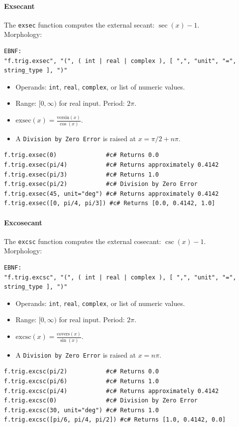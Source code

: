 \paragraph{Exsecant}
The \texttt{exsec} function computes the external secant: $\sec(x) - 1$.\\
Morphology:
\begin{verbatim}
EBNF:
"f.trig.exsec", "(", ( int | real | complex ), [ ",", "unit", "=", string_type ], ")"
\end{verbatim}
\begin{itemize}
\item Operands: \texttt{int}, \texttt{real}, \texttt{complex}, or list of numeric values.
\item Range: $[0, \infty)$ for real input. Period: $2\pi$.
\item $\text{exsec}(x) = \frac{\text{versin}(x)}{\cos(x)}$.
\item A \texttt{Division by Zero Error} is raised at $x = \pi/2 + n\pi$.
\end{itemize}
\begin{verbatim}
f.trig.exsec(0)              #c# Returns 0.0
f.trig.exsec(pi/4)           #c# Returns approximately 0.4142
f.trig.exsec(pi/3)           #c# Returns 1.0
f.trig.exsec(pi/2)           #c# Division by Zero Error
f.trig.exsec(45, unit="deg") #c# Returns approximately 0.4142
f.trig.exsec([0, pi/4, pi/3]) #c# Returns [0.0, 0.4142, 1.0]
\end{verbatim}

\paragraph{Excosecant}
The \texttt{excsc} function computes the external cosecant: $\csc(x) - 1$.\\
Morphology:
\begin{verbatim}
EBNF:
"f.trig.excsc", "(", ( int | real | complex ), [ ",", "unit", "=", string_type ], ")"
\end{verbatim}
\begin{itemize}
\item Operands: \texttt{int}, \texttt{real}, \texttt{complex}, or list of numeric values.
\item Range: $[0, \infty)$ for real input. Period: $2\pi$.
\item $\text{excsc}(x) = \frac{\text{covers}(x)}{\sin(x)}$.
\item A \texttt{Division by Zero Error} is raised at $x = n\pi$.
\end{itemize}
\begin{verbatim}
f.trig.excsc(pi/2)           #c# Returns 0.0
f.trig.excsc(pi/6)           #c# Returns 1.0
f.trig.excsc(pi/4)           #c# Returns approximately 0.4142
f.trig.excsc(0)              #c# Division by Zero Error
f.trig.excsc(30, unit="deg") #c# Returns 1.0
f.trig.excsc([pi/6, pi/4, pi/2]) #c# Returns [1.0, 0.4142, 0.0]
\end{verbatim}

